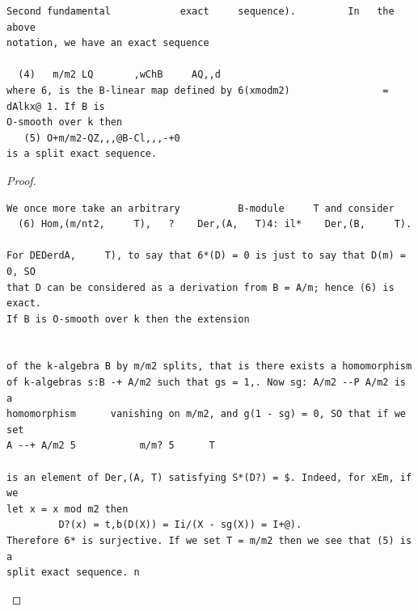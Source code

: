 \begin{theorem}\label{mcrt-auto-theorem-25-2}\uses{}
\begin{verbatim}
Second fundamental            exact     sequence).         In   the   above
notation, we have an exact sequence

  (4)   m/m2 LQ       ,wChB     AQ,,d
where 6, is the B-linear map defined by 6(xmodm2)                = dAlkx@ 1. If B is
O-smooth over k then
   (5) O+m/m2-QZ,,,@B-Cl,,,-+0
is a split exact sequence.
\end{verbatim}
\end{theorem}
\begin{proof}
\begin{verbatim}
We once more take an arbitrary          B-module     T and consider
  (6) Hom,(m/nt2,     T),   ?    Der,(A,   T)4: il*    Der,(B,     T).

For DEDerdA,     T), to say that 6*(D) = 0 is just to say that D(m) = 0, SO
that D can be considered as a derivation from B = A/m; hence (6) is exact.
If B is O-smooth over k then the extension


of the k-algebra B by m/m2 splits, that is there exists a homomorphism
of k-algebras s:B -+ A/m2 such that gs = 1,. Now sg: A/m2 --P A/m2 is a
homomorphism      vanishing on m/m2, and g(1 - sg) = 0, SO that if we set
A --+ A/m2 5           m/m? 5      T

is an element of Der,(A, T) satisfying S*(D?) = $. Indeed, for xEm, if we
let x = x mod m2 then
         D?(x) = t,b(D(X)) = Ii/(X - sg(X)) = I+@).
Therefore 6* is surjective. If we set T = m/m2 then we see that (5) is a
split exact sequence. n
\end{verbatim}
\end{proof}


